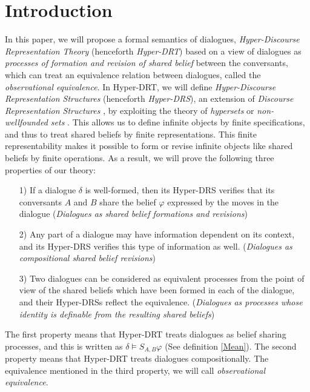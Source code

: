 \section{Introduction}  
In this paper, we will propose a formal semantics of dialogues, {\it Hyper-Discourse Representation Theory} (henceforth {\it Hyper-DRT}) based on a view of dialogues as {\it processes of formation and revision of shared belief} between the conversants, which can treat an equivalence relation between dialogues, called the {\it observational equivalence}.
In Hyper-DRT, we will define {\it Hyper-Discourse Representation Structures} (henceforth {\it Hyper-DRS}), an extension of {\it Discourse Representation Structures} \cite{Kam81,KR93}, 
by exploiting the theory of {\it hypersets} or {\it non-wellfounded sets} \cite{Acz87,BM96}.
This allows us to define infinite objects by finite specifications, 
and thus to treat shared beliefs by finite representations.
This finite representability makes it possible to form or revise infinite objects like shared beliefs by finite operations.
As a result, we will prove the following three properties of our theory:
\begin{enumerate}
\item[\hspace*{1cm}1)] If a dialogue $\delta$ is well-formed, then its Hyper-DRS verifies that its conversants $A$ and $B$ share the belief $\varphi$ expressed by the moves in the dialogue ({\it Dialogues as shared belief formations and revisions})
\item[\hspace*{1cm}2)] Any part of a dialogue may have information dependent on its context, and its Hyper-DRS verifies this type of information as well. ({\it Dialogues as compositional shared belief revisions})
\item[\hspace*{1cm}3)] Two dialogues can be considered as equivalent processes from the point of view of the shared beliefs which have been formed in each of the dialogue, and their Hyper-DRSs reflect the equivalence. ({\it Dialogues as processes whose identity is definable from the resulting shared beliefs})
\end{enumerate}
The first property means that Hyper-DRT treats dialogues as belief sharing processes, and this is written as $\delta\models S_{A,B}\varphi$ (See definition \ref{Mean}).
The second property means that Hyper-DRT treats dialogues compositionally.
The equivalence mentioned in the third property, we will call {\it observational equivalence}.
